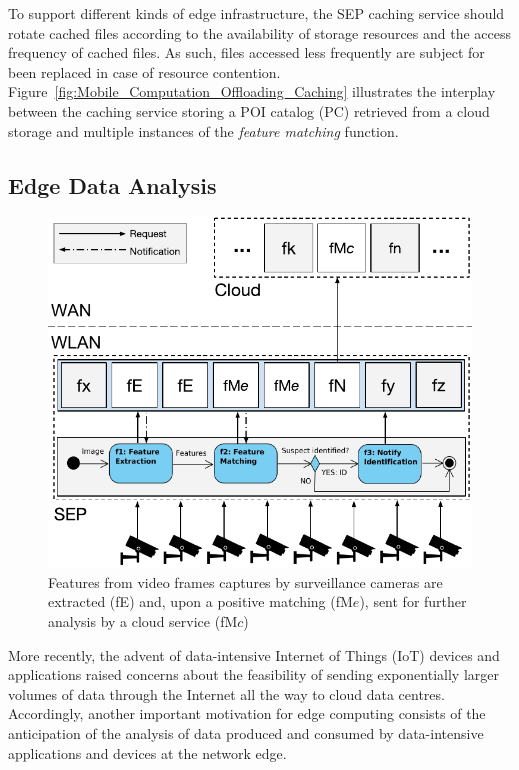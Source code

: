 \documentclass[letterpaper, 10 pt, conference]{ieeeconf}  %
\begin{document}
To support different kinds of edge infrastructure, the SEP caching service should rotate cached files according to the availability of storage resources and the access frequency of cached files. As such, files accessed less frequently are subject for been replaced in case of resource contention. 
Figure~\ref{fig:Mobile_Computation_Offloading_Caching} illustrates the interplay between the caching service storing a POI catalog (PC) retrieved from a cloud storage and multiple instances of the \textit{feature matching} function.

\subsection{Edge Data Analysis}

\begin{figure}[tbp]
	\centering
	\includegraphics[width=\linewidth]{Figs/Edge_Data_Analytics_Video_Surveillance.pdf}
	\caption{Features from video frames captures by surveillance cameras are extracted (fE) and, upon a positive matching (fM$e$), sent for further analysis by a cloud service (fM$c$)} 
	\label{fig:Edge_Data_Analytics_Video_Surveillance}
\end{figure}

More recently, the advent of data-intensive Internet of Things (IoT) devices and applications raised concerns about the feasibility of sending exponentially larger volumes of data through the Internet all the way to cloud data centres. Accordingly, another important motivation for edge computing consists of the anticipation of the analysis of data produced and consumed by data-intensive applications and devices at the network edge. 
\end{document}
